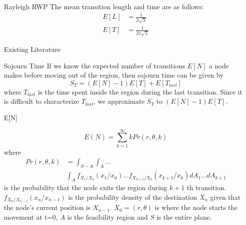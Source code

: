 \documentclass{beamer}
\begin{document}
\begin{frame}{Rayleigh RWP }
The mean transition length and time are as follows:
\vspace{0.75cm}
\begin{align*}
	E[L] &= \frac{1}{2\sqrt{\lambda}} \\[4ex]
	E[T] &= \frac{1}{2v\sqrt{\lambda}}
\end{align*}
\end{frame}

\begin{frame}{Existing Literature} {}



\end{frame}



\begin{frame}{Sojourn Time}{}
	If we know the expected number of transitions $E[N]$ a node makes before moving out of the
region, then sojourn time can be given by
\begin{equation*}
	S_T = (E[N]-1)E[T] + E[T_{last}]
\end{equation*}
where $T_{last}$ is the time spent inside the region during the last transition.
Since it is difficult to characterize $T_{last}$, we approximate $S_T$ to $(E[N]-1)E[T]$. 
\end{frame}



\begin{frame}{E[N]}{}

\begin{equation*}
	E(N) = \sum_{k=1}^{\infty} k Pr(r,\theta,k)
\end{equation*}
where 
\begin{align*}
	Pr(r,\theta,k) &= \int_{S-A} \int_A \ldots \\ &\int_A f_{X_1/X_0}(x_1/x_0)\ldots f_{X_{k+1}/X_{k}}(x_{k+1}/x_{k}) dA_1 \ldots dA_{k+1}
\end{align*} is the probability that the node exits the region during $k+1$ th transition. 
$f_{X_n/X_{n-1}}(x_n/x_{n-1})$ is the probability density of the destination $X_n$ given that
the node's current position is $X_{n-1}$. $X_0 = (r,\theta)$ is where the node starts the  movement at t=0, $A$ is the feasibility region and $S$ is the entire plane. 
\end{frame}
\end{document}
